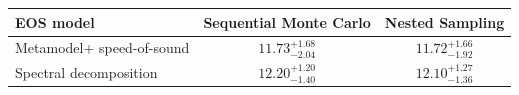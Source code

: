 \renewcommand{\arraystretch}{1.4}
\begin{tabular}{p{4.5cm}cc}
    \hline
    EOS model & Sequential Monte Carlo & Nested Sampling \\
    \hline
    Metamodel\newline + speed-of-sound & $11.73^{+1.68}_{-2.04}$ & $11.72^{+1.66}_{-1.92}$ \\
    Spectral decomposition & $12.20^{+1.20}_{-1.40}$ & $12.10^{+1.27}_{-1.36}$ \\
    \hline
\end{tabular}
